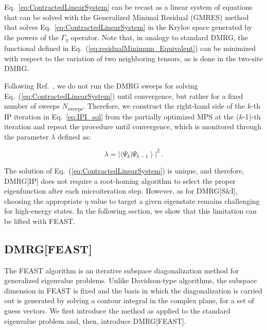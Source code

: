 \documentclass[journal=jctcce]{achemso}
\begin{document}
Eq.~\eqref{eq:ContractedLinearSystem} can be recast as a linear system of equations that can be solved with the Generalized Minimal Residual (GMRES) method\cite{Saad1986_GMRES,Koch2000_Bratwurst} that solves Eq.~\eqref{eq:ContractedLinearSystem} in the Krylov space generated by the powers of the $\Gamma_\eta$ operator.
Note that, in analogy to standard DMRG, the functional defined in Eq.~(\ref{eq:residualMinimum_Equivalent}) can be minimized with respect to the variation of two neighboring tensors, as is done in the two-site DMRG.\cite{Schollwoeck2011_Review-DMRG,Keller2015_MPS-MPO-SQHamiltonian}

\noindent Following Ref.~, we do not run the DMRG sweeps for solving Eq.~(\ref{eq:ContractedLinearSystem}) until convergence, but rather for a fixed number of sweeps $N_\text{sweeps}$.
Therefore, we construct the right-hand side of the $k$-th IP iteration in Eq.~\eqref{eq:IPI_sol} from the partially optimized MPS at the ($k$-1)-th iteration and repeat the procedure until convergence, which is monitored through the parameter $\lambda$ defined as:

\begin{equation} 
  \lambda= \left| \langle \Psi_{k} | \Psi_{k-1} \right \rangle|^2 \, .
  \label{eq:convergenceThreshold}
\end{equation}

\noindent The solution of Eq.~(\ref{eq:ContractedLinearSystem}) is unique, and therefore, DMRG[IP] does not require a root-homing algorithm to select the proper eigenfunction after each microiteration step.
However, as for DMRG[S\&I], choosing the appropriate $\eta$ value to target a given eigenstate remains challenging for high-energy states.
In the following section, we show that this limitation can be lifted with FEAST.

\subsection{DMRG[FEAST]}
\label{subsec:FEAST}

The FEAST algorithm\cite{Polizzi2009_FEAST,Galgon2011_FEAST-Review,Polizzi2014_FEAST-Iterative,Polizzi2015_FEAST-Zolotarev,Polizzi2016_FEAST-NonHermitian} is an iterative subspace diagonalization method for generalized eigenvalue problems.
Unlike Davidson-type algorithms,\cite{Davidson1975_DavidsonDiagonalization,Sleijpen2000_JacobiDavidson} the subspace dimension in FEAST is fixed and the basis in which the diagonalization is carried out is generated by solving a contour integral in the complex plane, for a set of guess vectors.
We first introduce the method as applied to the standard eigenvalue problem and, then, introduce DMRG[FEAST].
\end{document}
